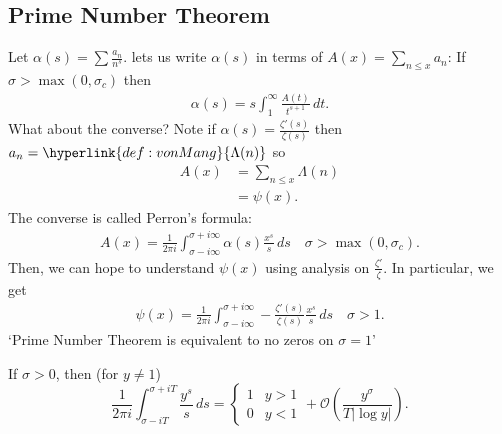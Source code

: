 \documentclass{article}
\newcommand{\1}{\mathbbm{1}}
\newcommand{\bigO}{\mathcal{O}}
\begin{document}
\subsection{Prime Number Theorem}
Let $\alpha(s) = \sum \frac{a_n}{n^s}$.  lets us write $\alpha(s)$ in terms of $A(x) = \sum_{n \leq x} a_n$:
If $\sigma > \max(0, \sigma_c)$ then
\begin{align*}
  \alpha(s) = s \int_1^\infty \frac{A(t)}{t^{s+1}}\,dt.
\end{align*}
What about the converse? Note if $\alpha(s) = \frac{\zeta'(s)}{\zeta(s)}$ then $a_n = \hyperlink{def:vonMang}{\Lambda(n)}$ so
\begin{align*}
  A(x) &= \sum_{n \leq x} \Lambda(n) \\&= \psi(x).
\end{align*}
The converse is called Perron's formula:
\begin{align*}
  A(x) = \frac{1}{2\pi i} \int_{\sigma-i\infty}^{\sigma+i\infty} \alpha(s) \frac{x^s}{s}\,ds \quad \sigma > \max(0,\sigma_c).
\end{align*}
Then, we can hope to understand $\psi(x)$ using analysis on $\frac{\zeta'}{\zeta}$.
In particular, we get
\begin{align*}
  \psi(x) = \frac{1}{2\pi i} \int_{\sigma-i\infty}^{\sigma+i\infty} -\frac{\zeta'(s)}{\zeta(s)} \frac{x^s}{s}\,ds \quad \sigma > 1.
\end{align*}
`Prime Number Theorem is equivalent to no zeros on $\sigma=1$'
\begin{lemma}
  If $\sigma > 0$, then (for $y \neq 1$)
  \begin{equation*}
    \frac{1}{2\pi i} \int_{\sigma-iT}^{\sigma + iT} \frac{y^s}{s}\,ds =
    \begin{cases}
      1 & y > 1 \\
      0 & y < 1
    \end{cases}
    + \bigO\left(\frac{y^\sigma}{T |\log y|}\right).
  \end{equation*}
\end{lemma}
\end{document}
